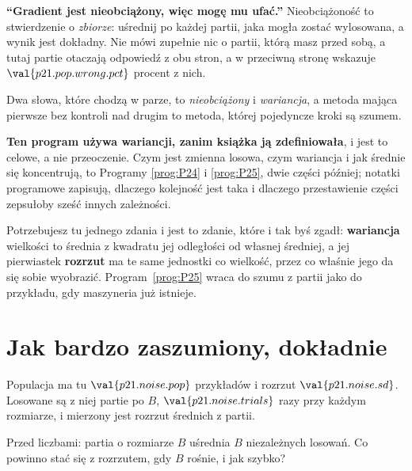 \begin{fr}
\begin{trapbox}
\textbf{\enquote{Gradient jest nieobciążony, więc mogę mu ufać.}}
Nieobciążoność to stwierdzenie o \emph{zbiorze}: uśrednij po każdej partii,
jaka mogła zostać wylosowana, a wynik jest dokładny. Nie mówi zupełnie nic o
partii, którą masz przed sobą, a tutaj partie otaczają odpowiedź z obu stron,
a w przeciwną stronę wskazuje $\val{p21.pop.wrong.pct}$ procent z nich.

Dwa słowa, które chodzą w parze, to \emph{nieobciążony} i \emph{wariancja}, a
metoda mająca pierwsze bez kontroli nad drugim to metoda, której pojedyncze
kroki są szumem.
\end{trapbox}
\end{fr}

\begin{fr}
\begin{rigourbox}
\textbf{Ten program używa wariancji, zanim książka ją zdefiniowała}, i jest to
celowe, a nie przeoczenie. Czym jest zmienna losowa, czym wariancja i jak
średnie się koncentrują, to Programy \ref{prog:P24} i \ref{prog:P25}, dwie
części później; notatki programowe zapisują, dlaczego kolejność jest taka i
dlaczego przestawienie części zepsułoby sześć innych zależności.

Potrzebujesz tu jednego zdania i jest to zdanie, które i tak byś zgadł:
\textbf{wariancja} wielkości to średnia z kwadratu jej odległości od własnej
średniej, a jej pierwiastek \dash{} \textbf{rozrzut} \dash{} ma te same
jednostki co wielkość, przez co właśnie jego da się sobie wyobrazić.
Program~\ref{prog:P25} wraca do szumu z partii jako do przykładu, gdy maszyneria
już istnieje.
\end{rigourbox}
\end{fr}

\section{Jak bardzo zaszumiony, dokładnie}
\label{sec:P21-variance}

\begin{fr}
Populacja ma tu $\val{p21.noise.pop}$ przykładów i rozrzut
$\val{p21.noise.sd}$. Losowane są z niej partie po $B$,
$\val{p21.noise.trials}$ razy przy każdym rozmiarze, i mierzony jest rozrzut
średnich z partii.

Przed liczbami: partia o rozmiarze $B$ uśrednia $B$ niezależnych losowań. Co
powinno stać się z rozrzutem, gdy $B$ rośnie, i jak szybko?
\dotline
\nextframe
\end{fr}

